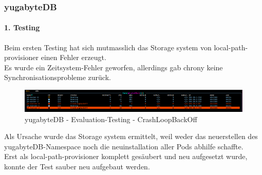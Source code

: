\usepackage{glossaries}%

\subsubsection{yugabyteDB}
\begin{flushleft}
    \paragraph{1. Testing}
    Beim ersten Testing hat sich mutmasslich das Storage system von \gls{local-path-provisioner} einen Fehler erzeugt.\\
    Es wurde ein Zeitsystem-Fehler geworfen, allerdings gab \gls{chrony} keine Synchronisationsprobleme zurück.\\
    \begin{figure}[H]
        \centering
        \includegraphics[width=0.8\linewidth]{source/implementation/evaluation/evaluation_tests/storage_errors/k8s_crashloopback}
        \caption{yugabyteDB - Evaluation-Testing - CrashLoopBackOff}
        \label{fig:k8s_crashloopback}
    \end{figure}
\begin{flushleft}
    Als Ursache wurde das Storage system ermittelt, weil weder das neuerstellen des yugabyteDB-Namespace noch die  neuinstallation aller Pods abhilfe schaffte.\\
    Erst als \gls{local-path-provisioner} komplett gesäubert und neu aufgesetzt wurde, konnte der Test sauber neu aufgebaut werden.
\end{flushleft}

\end{flushleft}
